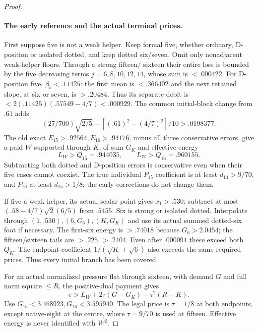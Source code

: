 \documentclass[11pt]{article}
\theoremstyle{definition}
\theoremstyle{remark}
\begin{document}
\begin{proof}
\paragraph{The early reference and the actual terminal prices.}
First suppose five is not a weak helper. Keep formal five, whether
ordinary, D-position or isolated dotted, and keep dotted six/seven.
Omit only nonadjacent weak-helper floors. Through a strong fifteen/
sixteen their entire loss is bounded by the five decreasing terms
$j=6,8,10,12,14$, whose sum is $<.000422$.
For D-position five, $\beta_5<.11425$: the first mean is
$<.366402$ and the next retained slope, at six or seven, is
$>.20484$. Thus its separate debit is
$<2(.11425)(.57549-4/7)<.000929$.
The common initial-block change from $.61$ adds
\[
 (27/700)\sqrt{2/5}-[(.61)^2-(4/7)^2]/10>.0198377.
\]
The old exact $E_{15}>.92564,E_{16}>.94176$, minus all three
conservative errors, give a paid $W$ supported through $K$, of
sum $G_K$ and effective energy
\[
 L_W>Q_{15}=.944035,\qquad L_W>Q_{16}=.960155.
\]
Subtracting both dotted and D-position errors is conservative even
when their five cases cannot coexist. The true individual $P_{15}$
coefficient is at least $d_{14}>9/70$, and $P_{16}$ at least
$d_{15}>1/8$; the early corrections do not change them.

If five a weak helper, its actual scalar point gives $x_1>.530$:
subtract at most $(.58-4/7)\sqrt2(6/5)$ from $.5455$.
Six is strong or isolated dotted. Interpolate through
$(1,.530),(6,G_6),(K,G_K)$ and use its actual summed dotted-six
foot if necessary. The first-six energy is $>.74018$ because
$G_6>2.0454$; the fifteen/sixteen tails are $>.225,>.2404$.
Even after $.000091$ these exceed both $Q_K$.
The endpoint coefficient $1/(\sqrt K+\sqrt6)$ also exceeds the
same required prices. Thus every initial branch has been covered.

For an actual normalized pressure flat through sixteen, with demand
$G$ and full norm square $\le R$, the positive-dual payment gives
\[
 e>L_W+2\tau(G-G_K)-\tau^2(R-K).
\]
Use $G_{15}<3.468923,G_{16}<3.595940$.
The legal price is $\tau=1/8$ at both endpoints, except native-eight
at the centre, where $\tau=9/70$ is used at fifteen.
Effective energy is never identified with $W^2$.


\end{proof}
\end{document}
